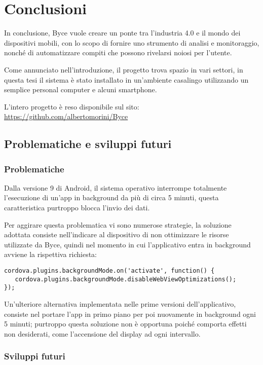 \documentclass[target=bach]{thud}
\begin{document}
\chapter{Conclusioni}

In conclusione, Byce vuole creare un ponte tra l'industria 4.0 e il mondo dei dispositivi mobili, con lo scopo di fornire uno strumento di analisi e monitoraggio, nonché di automatizzare compiti che possono rivelarsi noiosi per l'utente.

Come annunciato nell'introduzione, il progetto trova spazio in vari settori, in questa tesi il sistema è stato installato in un'ambiente casalingo utilizzando un semplice personal computer e alcuni smartphone.

L'intero progetto è reso disponibile sul sito: \url{https://github.com/albertomorini/Byce}

\section{Problematiche e sviluppi futuri}

\subsection{Problematiche}
Dalla versione 9 di Android, il sistema operativo interrompe totalmente l'esecuzione di un'app in background da più di circa 5 minuti, questa caratteristica purtroppo blocca l'invio dei dati.

Per aggirare questa problematica vi sono numerose strategie, la soluzione adottata consiste nell'indicare al dispositivo di non ottimizzare le risorse utilizzate da Byce, quindi nel momento in cui l'applicativo entra in background avviene la rispettiva richiesta:
\begin{lstlisting}
cordova.plugins.backgroundMode.on('activate', function() {
   cordova.plugins.backgroundMode.disableWebViewOptimizations();
});
\end{lstlisting}
Un'ulteriore alternativa implementata nelle prime versioni dell'applicativo, consiste nel portare l'app in primo piano per poi nuovamente in background ogni 5 minuti; purtroppo questa soluzione non è opportuna poiché comporta effetti non desiderati, come l'accensione del display ad ogni intervallo.


\subsection{Sviluppi futuri}
\end{document}
